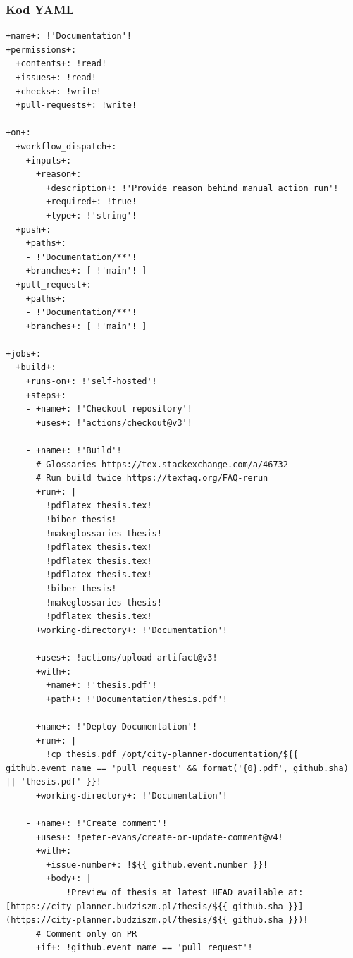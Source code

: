 \subsubsection{Kod YAML}
\begin{lstlisting}[style=yaml-colored]
+name+: !'Documentation'!
+permissions+:
  +contents+: !read!
  +issues+: !read!
  +checks+: !write!
  +pull-requests+: !write!

+on+:
  +workflow_dispatch+:
    +inputs+:
      +reason+:
        +description+: !'Provide reason behind manual action run'!
        +required+: !true!
        +type+: !'string'!
  +push+:
    +paths+:
    - !'Documentation/**'!
    +branches+: [ !'main'! ]
  +pull_request+:
    +paths+:
    - !'Documentation/**'!
    +branches+: [ !'main'! ]

+jobs+:
  +build+:
    +runs-on+: !'self-hosted'!
    +steps+:
    - +name+: !'Checkout repository'!
      +uses+: !'actions/checkout@v3'!

    - +name+: !'Build'!
      # Glossaries https://tex.stackexchange.com/a/46732
      # Run build twice https://texfaq.org/FAQ-rerun
      +run+: |
        !pdflatex thesis.tex!
        !biber thesis!
        !makeglossaries thesis!
        !pdflatex thesis.tex!
        !pdflatex thesis.tex!
        !pdflatex thesis.tex!
        !biber thesis!
        !makeglossaries thesis!
        !pdflatex thesis.tex!
      +working-directory+: !'Documentation'!

    - +uses+: !actions/upload-artifact@v3!
      +with+:
        +name+: !'thesis.pdf'!
        +path+: !'Documentation/thesis.pdf'!

    - +name+: !'Deploy Documentation'!
      +run+: |
        !cp thesis.pdf /opt/city-planner-documentation/${{ github.event_name == 'pull_request' && format('{0}.pdf', github.sha) || 'thesis.pdf' }}!
      +working-directory+: !'Documentation'!

    - +name+: !'Create comment'!
      +uses+: !peter-evans/create-or-update-comment@v4!
      +with+:
        +issue-number+: !${{ github.event.number }}!
        +body+: |
            !Preview of thesis at latest HEAD available at: [https://city-planner.budziszm.pl/thesis/${{ github.sha }}](https://city-planner.budziszm.pl/thesis/${{ github.sha }})!
      # Comment only on PR
      +if+: !github.event_name == 'pull_request'!
\end{lstlisting}
